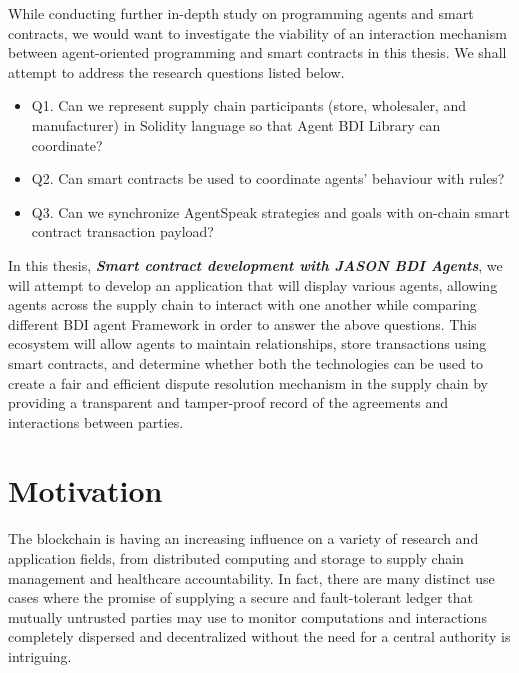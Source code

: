 \vspace{.5cm}
While conducting further in-depth study on programming agents and smart contracts, we would want to investigate the viability of an interaction mechanism between agent-oriented programming and smart contracts in this thesis. We shall attempt to address the research questions listed below.
\begin{itemize}[label={}]

 \item Q1. Can we represent supply chain participants (store, wholesaler, and manufacturer) in Solidity language so that Agent \ac{BDI} Library can coordinate?\\
 
 \item Q2. Can smart contracts be used to coordinate agents' behaviour with rules?\\
 
 \item Q3. Can we synchronize AgentSpeak strategies and goals with on-chain smart contract transaction payload?
\end{itemize}

\vspace{.5cm}

In this thesis, \textbf{\textit{Smart contract development with JASON \ac{BDI} Agents}}, we will attempt to develop an application that will display various agents, allowing agents across the supply chain to interact with one another while comparing different \ac{BDI} agent Framework in order to answer the above questions. This ecosystem will allow agents to maintain relationships, store transactions using smart contracts, and determine whether both the technologies can be used to create a fair and efficient dispute resolution mechanism in the supply chain by providing a transparent and tamper-proof record of the agreements and interactions between parties.

\section{Motivation}

The blockchain is having an increasing influence on a variety of research and application fields, from distributed computing and storage to supply chain management and healthcare accountability. In fact, there are many distinct use cases where the promise of supplying a secure and fault-tolerant ledger that mutually untrusted parties may use to monitor computations and interactions completely dispersed and decentralized without the need for a central authority is intriguing. 

